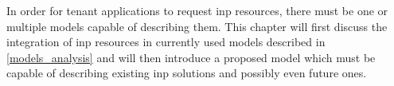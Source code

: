 In order for tenant applications to request \gls{inp} resources, there must be one or multiple models capable of describing them.
This chapter will first discuss the integration of \gls{inp} resources in currently used models described in \autoref{models_analysis} and will then introduce a proposed model which must be capable of describing existing \gls{inp} solutions and possibly even future ones.